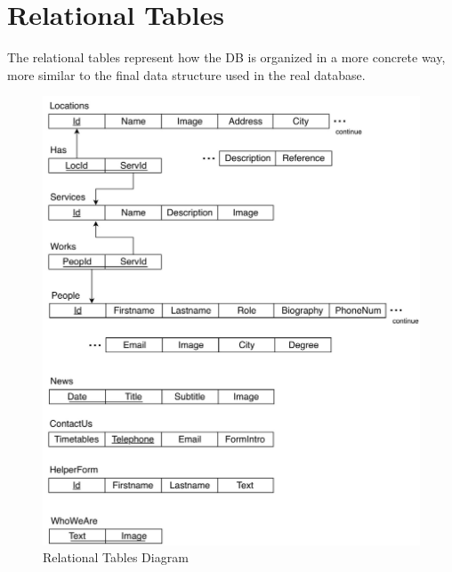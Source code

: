 \section{Relational Tables}
\par The relational tables represent how the DB is organized in a more concrete way, more similar to the final data structure used in the real database. 
\begin{figure}[h]
\includegraphics[width=0.945 \textwidth, center]{MainMatter/images/DB.jpg}
\caption{Relational Tables Diagram}
\label{fig:figure2}
\end{figure}
%
%

